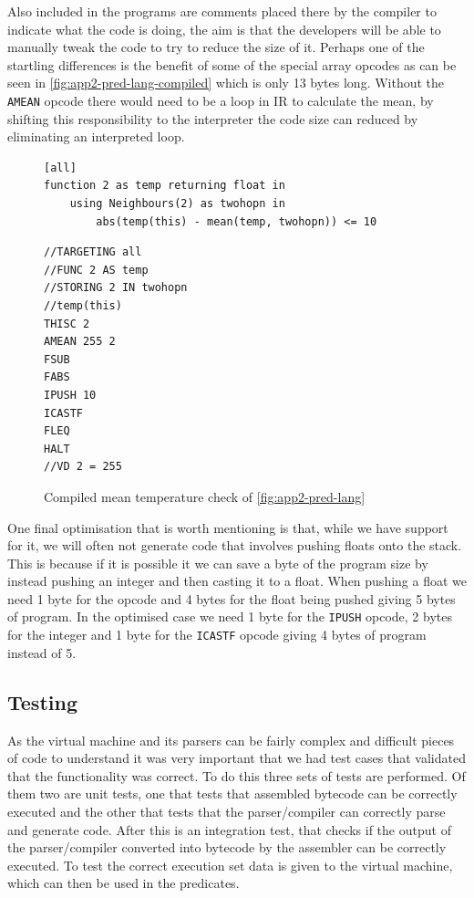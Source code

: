 Also included in the programs are comments placed there by the compiler to indicate what the code is doing, the aim is that the developers will be able to manually tweak the code to try to reduce the size of it. Perhaps one of the startling differences is the benefit of some of the special array opcodes as can be seen in \autoref{fig:app2-pred-lang-compiled} which is only 13 bytes long. Without the \verb|AMEAN| opcode there would need to be a loop in IR to calculate the mean, by shifting this responsibility to the interpreter the code size can reduced by eliminating an interpreted loop.

\begin{figure}[H]
\begin{minipage}{0.7\linewidth}
\begin{lstlisting}[language=Hoppy]
[all]
function 2 as temp returning float in
    using Neighbours(2) as twohopn in
        abs(temp(this) - mean(temp, twohopn)) <= 10
\end{lstlisting}
\end{minipage}
\begin{minipage}{0.2\linewidth}
\begin{lstlisting}[language=Dragon]
//TARGETING all
//FUNC 2 AS temp
//STORING 2 IN twohopn
//temp(this)
THISC 2
AMEAN 255 2
FSUB
FABS
IPUSH 10
ICASTF
FLEQ
HALT
//VD 2 = 255
\end{lstlisting}
\end{minipage}
\caption{Compiled mean temperature check of \autoref{fig:app2-pred-lang}}
\label{fig:app2-pred-lang-compiled}
\end{figure}

One final optimisation that is worth mentioning is that, while we have support for it, we will often not generate code that involves pushing floats onto the stack. This is because if it is possible it we can save a byte of the program size by instead pushing an integer and then casting it to a float. When pushing a float we need 1 byte for the opcode and 4 bytes for the float being pushed giving 5 bytes of program. In the optimised case we need 1 byte for the \verb|IPUSH| opcode, 2 bytes for the integer and 1 byte for the \verb|ICASTF| opcode giving 4 bytes of program instead of 5.


\subsection{Testing}

As the virtual machine and its parsers can be fairly complex and difficult pieces of code to understand it was very important that we had test cases that validated that the functionality was correct. To do this three sets of tests are performed. Of them two are unit tests, one that tests that assembled bytecode can be correctly executed and the other that tests that the parser/compiler can correctly parse and generate code. After this is an integration test, that checks if the output of the parser/compiler converted into bytecode by the assembler can be correctly executed. To test the correct execution set data is given to the virtual machine, which can then be used in the predicates.

